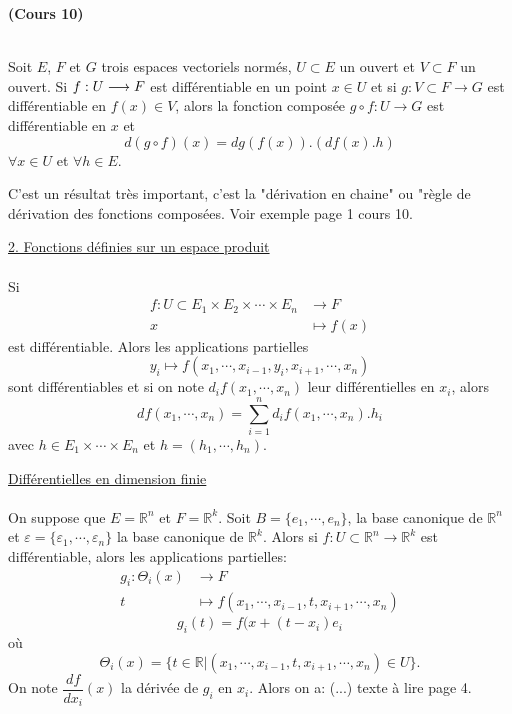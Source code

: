 \documentclass[12pt,a4paper]{article}
\begin{document}
\begin{flushleft}
\textbf{(Cours 10)}\\~\\

\begin{thm}
Soit $E$, $F$ et $G$ trois espaces vectoriels normés, $U \subset E$ un ouvert et $ V \subset F$ un ouvert. Si $\textit{$f:U \longrightarrow F$}$ est différentiable en un point $x \in U$ et si $g: V \subset F \longrightarrow G$ est différentiable en $f(x) \in V$, alors la fonction composée $g \circ f : U \longrightarrow G$ est différentiable en $x$ et $$ d( g \circ f ) (x) = dg(f(x)) . (df(x).h)$$ $\forall x \in U$ et $\forall h \in E$.
\end{thm}

\begin{rem}
C'est un résultat très important, c'est la "dérivation en chaine" ou "règle de dérivation des fonctions composées. Voir exemple page 1 cours 10.
\end{rem}

\underline{2. Fonctions définies sur un espace produit}\\~\\
Si 
\begin{align*}
f: U \subset E_1 \times E_2 \times \cdots \times E_n & \longrightarrow F\\
					x & \longmapsto f(x)
\end{align*}
est différentiable. Alors les applications partielles $$y_i \longmapsto f(x_1, \cdots , x_{i-1} , y_i, x_{i+1} , \cdots , x_n)$$ sont différentiables et si on note $ d_i f(x_1, \cdots , x_n)$ leur différentielles en $x_i$, alors $$df(x_1, \cdots , x_n) = \sum\limits_{i=1}^n d_i f(x_1, \cdots , x_n) . h_i$$ avec $h \in E_1 \times \cdots \times E_n$ et $h = (h_1, \cdots , h_n)$.

\underline{Différentielles en dimension finie}\\~\\
On suppose que $E = \mathbb{R}^n$ et $F = \mathbb{R}^k$. Soit $B = \{ e_1, \cdots , e_n \}$, la base canonique de $\mathbb{R}^n$ et $\varepsilon = \{ \varepsilon_1, \cdots , \varepsilon_n \}$ la base canonique de $\mathbb{R}^k$. Alors si $f: U \subset \mathbb {R}^n \longrightarrow \mathbb{R}^k$ est différentiable, alors les applications partielles:
\begin{align*}
g_i: \Theta_i(x) & \longrightarrow F\\
					t & \longmapsto  f(x_1, \cdots , x_{i-1} , t , x_{i+1} , \cdots , x_n)
\end{align*}
$$g_i(t) = f(x+(t-x_i) e_i$$ où $$ \Theta_i (x) = \{ t \in \mathbb{R} | (x_1, \cdots , x_{i-1} , t , x_{i+1} , \cdots , x_n) \in U \}.$$ On note $\dfrac{df}{dx_i} (x)$ la dérivée de $g_i$ en $x_i$. Alors on a: (...) texte à lire page 4.


\end{flushleft}
\end{document}
